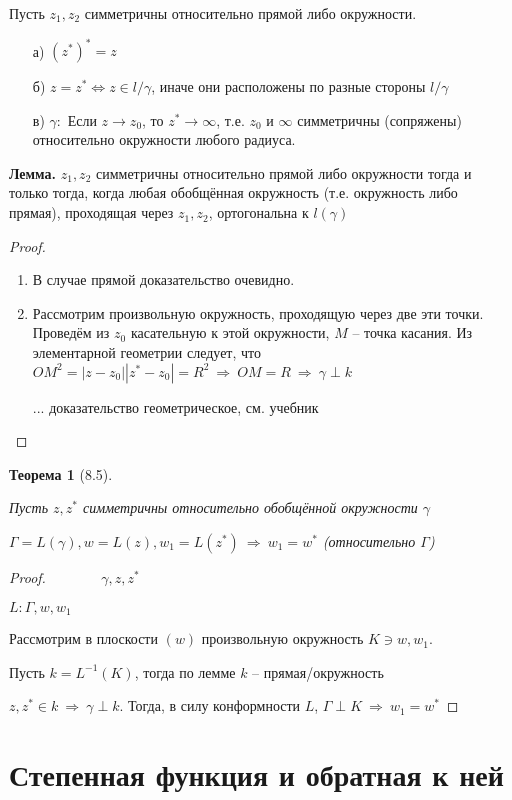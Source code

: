 \documentclass[draft]{article}
\newcommand{\forcenewline}{$\phantom{\mbox{newline}}$\newline}
\newcommand{\then}{\ \Rightarrow\ }
\newcommand{\LRA}{\Leftrightarrow}
\newcommand{\g}{\gamma}
\newtheorem*{theor}{Теорема}
\theoremstyle{remark}
\begin{document}
Пусть $z_1, z_2$ симметричны относительно прямой либо окружности.
\begin{enumerate}
\item[а)] $(z^*)^*=z$
\item[б)] $z=z^* \LRA z\in l/\g$, иначе они расположены по разные стороны $l/\g$
\item[в)] $\g\colon$ Если $z\to z_0$, то $z^*\to\infty$, т.е. $z_0$ и $\infty$ симметричны (сопряжены) относительно окружности любого радиуса.
\end{enumerate}

{\bfseries Лемма.} $z_1, z_2$ симметричны относительно прямой либо окружности тогда и только тогда, когда любая обобщённая окружность (т.е. окружность либо прямая), проходящая через $z_1, z_2$, ортогональна к $l(\g)$
\begin{proof}
\begin{enumerate}
\item В случае прямой доказательство очевидно.
\item Рассмотрим произвольную окружность, проходящую через две эти точки. Проведём из $z_0$ касательную к этой окружности, $M$ -- точка касания. Из элементарной геометрии следует, что $OM^2=|z-z_0||z^*-z_0|=R^2 \then OM=R \then \g\perp k$

... доказательство геометрическое, см. учебник
\end{enumerate}
\end{proof}

\begin{theor}[8.5]
\forcenewline

Пусть $z,z^*$ симметричны относительно обобщённой окружности $\g$

$\Gamma=L(\g), w=L(z), w_1=L(z^*) \then w_1=w^*$ (относительно $\Gamma$)
\end{theor}

\begin{proof}
\forcenewline
$\g,z,z^*$

$L\colon \Gamma,w,w_1$

Рассмотрим в плоскости $(w)$ произвольную окружность $K\ni w,w_1$.

Пусть $k=L^{-1}(K)$, тогда по лемме $k$ -- прямая/окружность

$z,z^*\in k\then \g\perp k$. Тогда, в силу конформности $L$, $\Gamma\perp K \then w_1=w^*$
\end{proof}

\newpage

\section{Степенная функция и обратная к ней}
\end{document}
